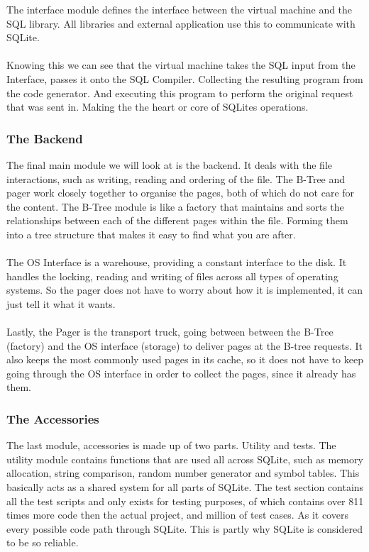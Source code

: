 The interface module defines the interface between the virtual machine and the SQL library. All libraries and external application use this to communicate with SQLite.
\\\\
Knowing this we can see that the virtual machine takes the SQL input from the Interface, passes it onto the SQL Compiler. Collecting the resulting program from the code generator. And executing this program to perform the original request that was sent in. Making the the heart or core of SQLites operations.

\subsubsection{The Backend}
\label{subsec:how_sqlite_backend}

The final main module we will look at is the backend. It deals with the file interactions, such as writing, reading and ordering of the file. The B-Tree and pager work closely together to organise the pages, both of which do not care for the content. The B-Tree module is like a factory that maintains and sorts the relationships between each of the different pages within the file. Forming them into a tree structure that makes it easy to find what you are after. 
\\\\
The OS Interface is a warehouse, providing a constant interface to the disk. It handles the locking, reading and writing of files across all types of operating systems. So the pager does not have to worry about how it is implemented, it can just tell it what it wants.
\\\\
Lastly, the Pager is the transport truck, going between between the B-Tree (factory) and the OS interface (storage) to deliver pages at the B-tree requests. It also keeps the most commonly used pages in its cache, so it does not have to keep going through the OS interface in order to collect the pages, since it already has them.

\subsubsection{The Accessories}
\label{subsec:how_sqlite_accessories}

The last module, accessories is made up of two parts. Utility and tests. The utility module contains functions that are used all across SQLite, such as memory allocation, string comparison, random number generator and symbol tables. This basically acts as a shared system for all parts of SQLite. The test section contains all the test scripts and only exists for testing purposes, of which contains over 811 times more code then the actual project, and million of test cases. As it covers every possible code path through SQLite. This is partly why SQLite is considered to be so reliable. 

